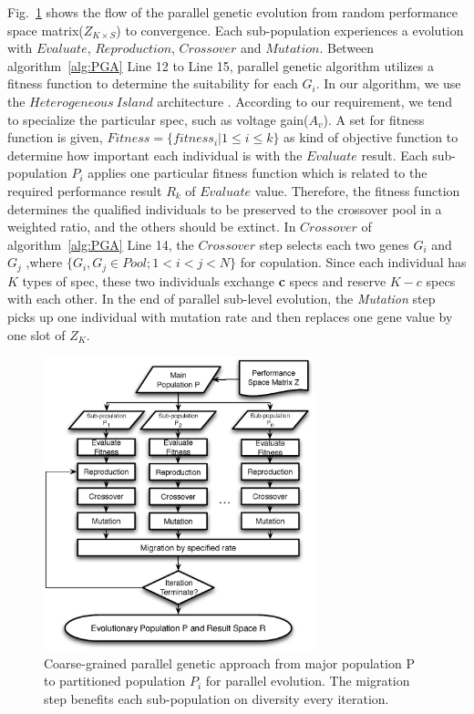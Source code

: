       Fig.~\ref{fig:PGAFlow} shows the flow of the parallel genetic evolution from random performance space matrix($Z_{K\times S}$) to convergence. Each sub-population experiences a evolution with $Evaluate$, $Reproduction$, $Crossover$ and $Mutation$. Between algorithm~\ref{alg:PGA} Line 12 to Line 15, parallel genetic algorithm utilizes a fitness function to determine the suitability for each $G_i$. In our algorithm, we use the $Heterogeneous\ Island$ architecture \cite{SurveyCGPGA1994}. According to our requirement, we tend to specialize the particular spec, such as voltage gain($A_v$). A set for fitness function is given, $Fitness = \{{fitness}_i| 1 \leq i \leq k\}$ as kind of objective function to determine how important each individual is with the $Evaluate$ result. Each sub-population $P_i$ applies one particular fitness function which is related to the required performance result $R_k$ of $Evaluate$ value. Therefore, the fitness function determines the qualified individuals to be preserved to the crossover pool in a weighted ratio, and the others should be extinct. In $Crossover$ of algorithm~\ref{alg:PGA} Line 14, the $Crossover$ step selects each two genes $G_i$ and $G_j$ ,where $\{G_i,G_j \in Pool; 1 < i<j<N\} $ for copulation. Since each individual has $K$ types of spec, these two individuals exchange {\bf c} specs and reserve {\bf $K-c$} specs with each other. In the end of parallel sub-level evolution, the {\it Mutation} step picks up one individual with mutation rate and then replaces one gene value by one slot of $Z_K$. 
    
      \begin{figure}[t]
        \centering
        \includegraphics[width=0.7\textwidth]{Fig/Chapter2/PAGEflowchart.eps}
        \caption{Coarse-grained parallel genetic approach from major population P to partitioned population $P_i$ for parallel evolution. The migration step benefits each sub-population on diversity every iteration.} 
        \label{fig:PGAFlow}
      \end{figure}

